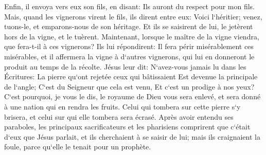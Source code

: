 \verse Enfin, il envoya vers eux son fils, en disant: Ils auront du respect pour mon fils. 
\verse Mais, quand les vignerons virent le fils, ils dirent entre eux: Voici l`héritier; venez, tuons-le, et emparons-nous de son héritage. 
\verse Et ils se saisirent de lui, le jetèrent hors de la vigne, et le tuèrent. 
\verse Maintenant, lorsque le maître de la vigne viendra, que fera-t-il à ces vignerons? 
\verse Ils lui répondirent: Il fera périr misérablement ces misérables, et il affermera la vigne à d`autres vignerons, qui lui en donneront le produit au temps de la récolte. 
\verse Jésus leur dit: N`avez-vous jamais lu dans les Écritures: La pierre qu`ont rejetée ceux qui bâtissaient Est devenue la principale de l`angle; C`est du Seigneur que cela est venu, Et c`est un prodige à nos yeux? 
\verse C`est pourquoi, je vous le dis, le royaume de Dieu vous sera enlevé, et sera donné à une nation qui en rendra les fruits. 
\verse Celui qui tombera sur cette pierre s`y brisera, et celui sur qui elle tombera sera écrasé. 
\verse Après avoir entendu ses paraboles, les principaux sacrificateurs et les pharisiens comprirent que c`était d`eux que Jésus parlait, 
\verse et ils cherchaient à se saisir de lui; mais ils craignaient la foule, parce qu`elle le tenait pour un prophète. 

